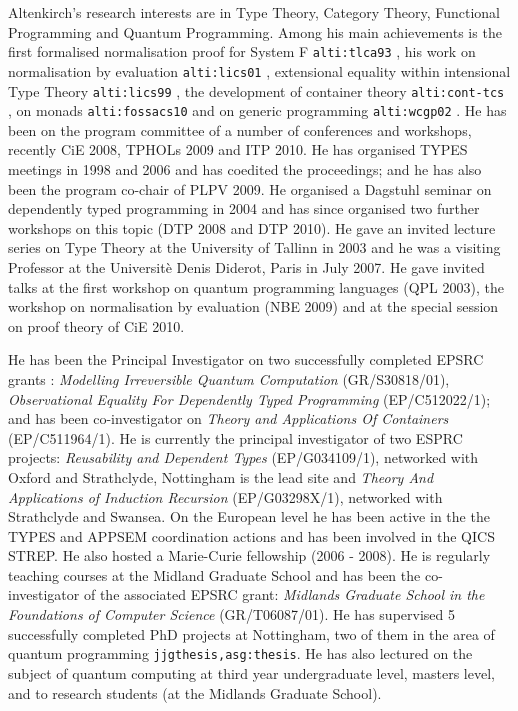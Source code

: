 \documentclass[a4paper]{article}
\renewcommand{\cite}[1]{{\tt #1}}
\newcommand{\citetrack}[1]{\cite{#1}}
\begin{document}
Altenkirch's research interests are in Type Theory, Category Theory, Functional
Programming and Quantum Programming. 
Among his main achievements is
the first formalised normalisation proof for System F
\citetrack{alti:tlca93}
, his work on normalisation by evaluation 
\citetrack{alti:lics01}%
, extensional equality within intensional Type Theory \citetrack{alti:lics99}
, the development of container theory \citetrack{alti:cont-tcs}%
, on
monads \citetrack{alti:fossacs10} 
and on generic programming 
\citetrack{alti:wcgp02}
.
He has been on the program committee of a number of conferences and
workshops, recently CiE 2008, TPHOLs 2009 and ITP 2010. He has
organised TYPES meetings in 1998 and 2006 and has coedited the
proceedings; and he has also been the program co-chair of PLPV 2009.  He
organised a Dagstuhl seminar on dependently typed programming in 2004
and has since organised two further workshops on this topic (DTP 2008
and DTP 2010). He gave an invited lecture series on Type Theory at the
University of Tallinn in 2003 and he was a visiting Professor at the
Universit\`{e} Denis Diderot, Paris in  July 2007. He gave invited talks
at the first workshop on quantum programming languages (QPL 2003), the
workshop on normalisation by evaluation (NBE 2009) and at the special
session on proof theory of CiE 2010.


He has been the Principal Investigator on two successfully completed
EPSRC grants : \emph{Modelling Irreversible Quantum Computation}
(GR/S30818/01), \emph{Observational Equality For Dependently Typed
  Programming} (EP/C512022/1); and has been co-investigator on
\emph{Theory and Applications Of Containers} (EP/C511964/1). 
He is currently the principal investigator of two ESPRC
projects: \emph{Reusability and Dependent Types} (EP/G034109/1), 
networked with
Oxford and Strathclyde, Nottingham is the lead site and 
\emph{Theory And Applications of Induction
  Recursion} (EP/G03298X/1), networked with Strathclyde and Swansea. 
On the European level he has been active in the the
TYPES and APPSEM coordination actions and has been involved in the
QICS STREP. He also hosted a Marie-Curie fellowship (2006 - 2008). He
is regularly teaching courses at the Midland Graduate School and has
been the co-investigator of the associated EPSRC grant: \emph{Midlands
  Graduate School in the Foundations of Computer Science}
(GR/T06087/01). He has supervised 5 successfully completed PhD
projects at Nottingham, two of them in the area of quantum
programming \citetrack{jjgthesis,asg:thesis}. He has also lectured 
on the subject of quantum computing at third year
undergraduate level, masters level, and to research students 
(at the Midlands Graduate School).
\end{document}
